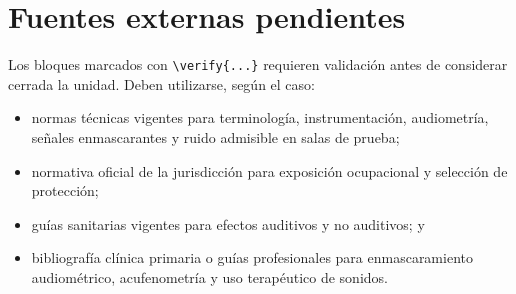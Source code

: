 \section{Fuentes externas pendientes}
\label{sec:u10-fuentes}

Los bloques marcados con \verb|\verify{...}| requieren validación antes de
considerar cerrada la unidad. Deben utilizarse, según el caso:
\begin{itemize}
    \item normas técnicas vigentes para terminología, instrumentación,
    audiometría, señales enmascarantes y ruido admisible en salas de prueba;
    \item normativa oficial de la jurisdicción para exposición ocupacional y
    selección de protección;
    \item guías sanitarias vigentes para efectos auditivos y no auditivos; y
    \item bibliografía clínica primaria o guías profesionales para
    enmascaramiento audiométrico, acufenometría y uso terapéutico de sonidos.
\end{itemize}
